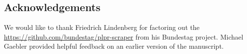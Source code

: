 \documentclass[11pt]{article}
\begin{document}
\subsection*{Acknowledgements}
We would like to thank Friedrich Lindenberg for factoring out the \url{https://github.com/bundestag/plpr-scraper} from his Bundestag project. Michael Gaebler provided helpful feedback on an earlier version of the manuscript. \\
%
\newpage
\small{


}
\end{document}
